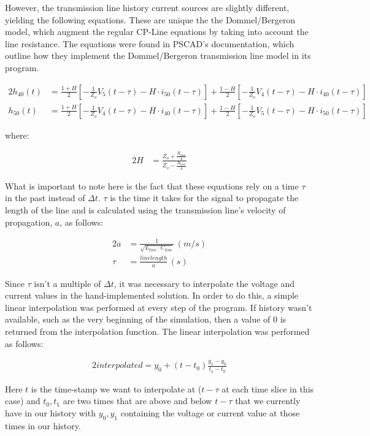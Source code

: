 \documentclass[10pt, oneside, letterpaper]{article}
\begin{document}
However, the transmission line history current sources are slightly different, yielding the following equations. These are unique the the Dommel/Bergeron model, which augment the regular CP-Line equations by taking into account the line resistance. The equations were found in PSCAD's documentation, which outline how they implement the Dommel/Bergeron transmission line model in its program.

\begin{alignat}{2}
h_{40}(t) &= \frac{1 + H}{2}\left[-\frac{1}{Z_o}V_5(t-\tau) - H\cdot i_{50}(t-\tau)\right] + \frac{1 - H}{2}\left[-\frac{1}{Z_o}V_4(t-\tau) - H\cdot i_{40}(t-\tau)\right] \\ 
h_{50}(t) &= \frac{1 + H}{2}\left[-\frac{1}{Z_o}V_4(t-\tau) - H\cdot i_{40}(t-\tau)\right] + \frac{1 - H}{2}\left[-\frac{1}{Z_o}V_5(t-\tau) - H\cdot i_{50}(t-\tau)\right]
\end{alignat}

where:

\begin{alignat}{2}
H &= \frac{Z_o + \frac{R_{line}}{4}}{Z_o - \frac{R_{line}}{4}}
\end{alignat}

What is important to note here is the fact that these equations rely on a time $\tau$ in the past instead of $\Delta{}t$. $\tau$ is the time it takes for the signal to propagate the length of the line and is calculated using the transmission line's velocity of propagation, $a$, as follows:

\begin{alignat}{2}
a &= \frac{1}{\sqrt{L_{line}\cdot{}C_{line}}}\,(m/s)\\
\tau &= \frac{linelength}{a}\,(s)
\end{alignat}

Since $\tau$ isn't a multiple of $\Delta{}t$, it was necessary to interpolate the voltage and current values in the hand-implemented solution. In order to do this, a simple linear interpolation was performed at every step of the program. If history wasn't available, such as the very beginning of the simulation, then a value of 0 is returned from the interpolation function. The linear interpolation was performed as follows:

\begin{alignat}{2}
interpolated = y_0 + (t - t_0)\frac{y_1 - y_0}{t_1 - t_0}
\end{alignat}

Here $t$ is the time-stamp we want to interpolate at ($t - \tau$ at each time slice in this case) and $t_0, t_1$ are two times that are above and below $t - \tau$ that we currently have in our history with $y_0, y_1$ containing the voltage or current value at those times in our history.
\end{document}
